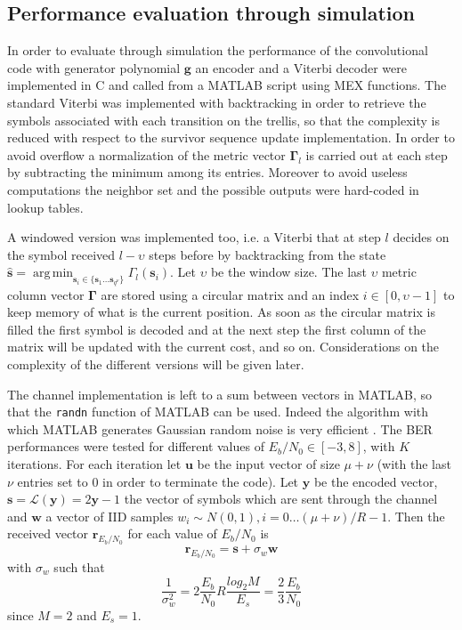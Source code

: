 \documentclass[10pt]{article}
\DeclareMathOperator*{\argmin}{arg\,min}
\begin{document}
\subsection{Performance evaluation through simulation}

In order to evaluate through simulation the performance of the convolutional code with generator polynomial $\mathbf{g}$ an encoder and a Viterbi decoder were implemented in C and called from a MATLAB script using MEX functions. The standard Viterbi was implemented with backtracking in order to retrieve the symbols associated with each transition on the trellis, so that the complexity is reduced with respect to the survivor sequence update implementation. In order to avoid overflow a normalization of the metric vector $\mathbf{\Gamma}_l$ is carried out at each step by subtracting the minimum among its entries. Moreover to avoid useless computations the neighbor set and the possible outputs were hard-coded in lookup tables. 

A windowed version was implemented too, i.e. a Viterbi that at step $l$ decides on the symbol received $l - \upsilon$ steps before by backtracking from the state $\mathbf{\hat{s}} = \argmin_{\mathbf{s}_i \in \{\mathbf{s}_1 \dots \mathbf{s}_{q^{\nu}}\}} \Gamma_l(\mathbf{s}_i)$. Let $\upsilon$ be the window size. The last $\upsilon$ metric column vector $\mathbf{\Gamma}$ are stored using a circular matrix and an index $i\in[0, \upsilon-1]$ to keep memory of what is the current position. As soon as the circular matrix is filled the first symbol is decoded and at the next step the first column of the matrix will be updated with the current cost, and so on. Considerations on the complexity of the different versions will be given later. 

The channel implementation is left to a sum between vectors in MATLAB, so that the \texttt{randn} function of MATLAB can be used. Indeed the algorithm with which MATLAB generates Gaussian random noise is very efficient \cite{moler}. 
The BER performances were tested for different values of $E_b/N_0 \in [-3, 8]$, with $K$ iterations. For each iteration let $\mathbf{u}$ be the input vector of size $\mu + \nu$ (with the last $\nu$ entries set to $0$ in order to terminate the code). Let $\mathbf{y}$ be the encoded vector, $\mathbf{s} = \mathcal{L}(\mathbf{y}) = 2\mathbf{y} - 1$ the vector of symbols which are sent through the channel and $\mathbf{w}$ a vector of IID samples $w_i \sim N(0,1), i = 0 \dots (\mu + \nu)/R - 1$. Then the received vector $\mathbf{r}_{E_b/N_0}$ for each value of $E_b/N_0$ is 
\begin{equation}
	\mathbf{r}_{E_b/N_0} = \mathbf{s} + \sigma_w \mathbf{w}
\end{equation}
with $\sigma_w$ such that
\begin{equation}
	\frac{1}{\sigma_w^2} = 2\frac{E_b}{N_0}R\frac{log_2M}{E_s} = \frac{2}{3} \frac{E_b}{N_0}
\end{equation}
since $M=2$ and $E_s = 1$.
\end{document}
